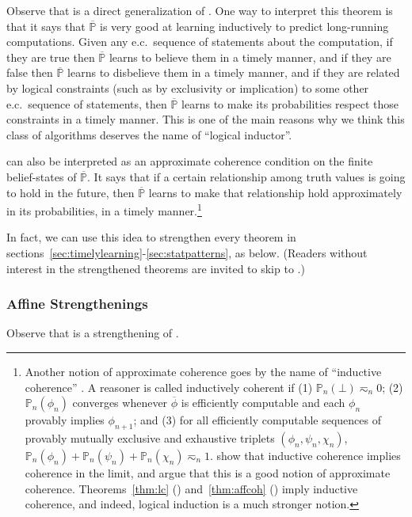 \documentclass[authordate,onecolumn,noenvironments]{miri-tech-article}
\numberwithin{equation}{subsection}
\newcommand{\seq}[1]{{\overline{#1}}}
\newcommand{\nn}{n}
\newcommand{\phis}{\seq{\phi}}
\newcommand{\ec}[1][\ ]{e.c.#1}
\newcommand{\BelState}{\mathbb{P}}
\newcommand{\pt}{\BelState}
\newcommand{\MP}{\seq{\pt}}
\begin{document}
Observe that  is a direct generalization of . One way to interpret this theorem is that it says that $\MP$ is very good at learning inductively to predict long-running computations. Given any \ec sequence of statements about the computation, if they are true then $\MP$ learns to believe them in a timely manner, and if they are false then $\MP$ learns to disbelieve them in a timely manner, and if they are related by logical constraints (such as by exclusivity or implication) to some other \ec sequence of statements, then $\MP$ learns to make its probabilities respect those constraints in a timely manner. This is one of the main reasons why we think this class of algorithms deserves the name of ``logical inductor''.

 can also be interpreted as an approximate coherence condition on the finite belief-states of $\MP$. It says that if a certain relationship among truth values is going to hold in the future, then $\MP$ learns to make that relationship hold approximately in its probabilities, in a timely manner.\footnote{Another notion of approximate coherence goes by the name of ``inductive coherence'' \citep{Garrabrant:2016:ic}. A reasoner is called inductively coherent if (1) $\pt_\nn(\bot) \eqsim_\nn 0$; (2) $\pt_\nn(\phi_\nn)$ converges whenever $\phis$ is efficiently computable and each $\phi_\nn$ provably implies $\phi_{\nn + 1}$; and (3) for all efficiently computable sequences of provably mutually exclusive and exhaustive triplets $(\phi_\nn, \psi_\nn, \chi_\nn)$, $\pt_\nn(\phi_\nn) + \pt_\nn(\psi_\nn) + \pt_\nn(\chi_\nn) \eqsim_\nn 1$. \citeauthor{Garrabrant:2016:ic} show that inductive coherence implies coherence in the limit, and argue that this is a good notion of approximate coherence. Theorems~\ref{thm:lc} () and~\ref{thm:affcoh} () imply inductive coherence, and indeed, logical induction is a much stronger notion.}

In fact, we can use this idea to strengthen every theorem in sections~\ref{sec:timelylearning}-\ref{sec:statpatterns}, as below. (Readers without interest in the strengthened theorems are invited to skip to .)

\subsubsection{Affine Strengthenings}

Observe that  is a strengthening of .
\end{document}
